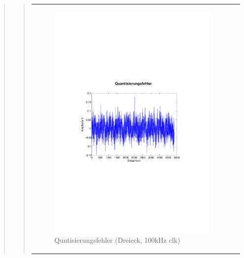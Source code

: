 \begin{quote}
\begin{quote}
\begin{center}
\begin{tabular}{ll}
            \hspace{-4cm}
                
                \begin{minipage}{0.55\textwidth}
                    \begin{figure}[H]
                        \includegraphics[scale=0.55, trim = 3cm 9cm 1.6cm
                        8.5cm, clip]
                        {./Bilder/drei100_Quantisierungsfehler}
                          \caption{Quntisierungsfehler (Dreieck, 100kHz clk)}
                    \end{figure}
                \end{minipage}
                              

\end{tabular}
\end{center}
\end{quote}
\end{quote}
